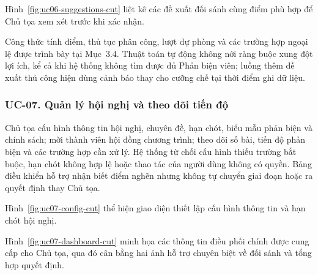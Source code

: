 
Hình~\ref{fig:uc06-suggestions-cut} liệt kê các đề xuất đối sánh cùng điểm phù hợp để Chủ tọa xem xét trước khi xác nhận.

Công thức tính điểm, thủ tục phân công, lượt dự phòng và các trường hợp ngoại lệ được trình bày tại Mục~3.4. Thuật toán tự động không nới ràng buộc xung đột lợi ích, kể cả khi hệ thống không tìm được đủ Phản biện viên; luồng thêm đề xuất thủ công hiện dùng cảnh báo thay cho cưỡng chế tại thời điểm ghi dữ liệu.

\subsubsection{UC-07. Quản lý hội nghị và theo dõi tiến độ}

Chủ tọa cấu hình thông tin hội nghị, chuyên đề, hạn chót, biểu mẫu phản biện và chính sách; mời thành viên hội đồng chương trình; theo dõi số bài, tiến độ phản biện và các trường hợp cần xử lý. Hệ thống từ chối cấu hình thiếu trường bắt buộc, hạn chót không hợp lệ hoặc thao tác của người dùng không có quyền. Bảng điều khiển hỗ trợ nhận biết điểm nghẽn nhưng không tự chuyển giai đoạn hoặc ra quyết định thay Chủ tọa.


Hình~\ref{fig:uc07-config-cut} thể hiện giao diện thiết lập cấu hình thông tin và hạn chót hội nghị.


Hình~\ref{fig:uc07-dashboard-cut} minh họa các thông tin điều phối chính được cung cấp cho Chủ tọa, qua đó cân bằng hai ảnh hỗ trợ chuyên biệt về đối sánh và tổng hợp quyết định.

